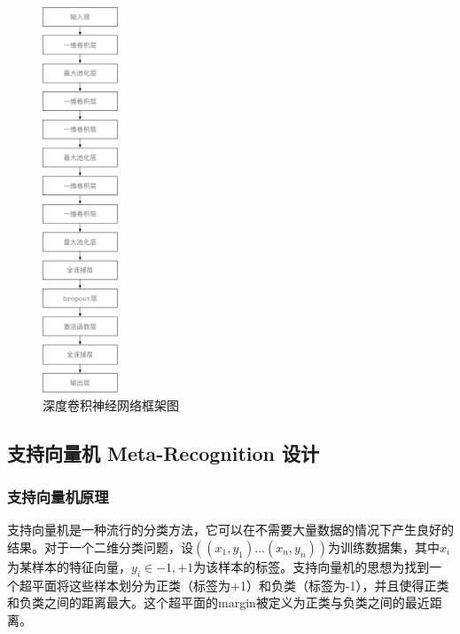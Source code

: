 \begin{figure}
	\centering
	\includegraphics[width=0.2\textwidth]{figures/struct_emitter.pdf}
	\caption{深度卷积神经网络框架图}
\end{figure}


\subsection{支持向量机 Meta-Recognition 设计}

\subsubsection{支持向量机原理}
支持向量机是一种流行的分类方法，它可以在不需要大量数据的情况下产生良好的结果。对于一个二维分类问题，设$((x_1,y_1)\dots(x_n,y_n))$为训练数据集，其中$x_i$为某样本的特征向量，$y_i\in{-1,+1}$为该样本的标签。支持向量机的思想为找到一个超平面将这些样本划分为正类（标签为+1）和负类（标签为-1），并且使得正类和负类之间的距离最大。这个超平面的margin被定义为正类与负类之间的最近距离。

